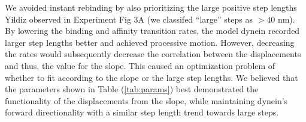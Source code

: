 We avoided instant rebinding by also prioritizing the large positive step lengths Yildiz observed in Experiment Fig 3A (we classifed ``large'' steps as $> 40$ nm). By lowering the binding and affinity transition rates,  the model dynein recorded larger step lengths better and achieved processive motion. However, decreasing the rates would subsequently decrease the correlation between the displacements and thus, the value for the slope. This caused an optimization problem of whether to fit according to the slope or the large step lengths. We believed that the parameters shown in Table (\ref{tab:params}) best demonstrated the functionality of the displacements from the slope, while maintaining dynein's forward directionality with a similar step length trend towards large steps.

%


%

